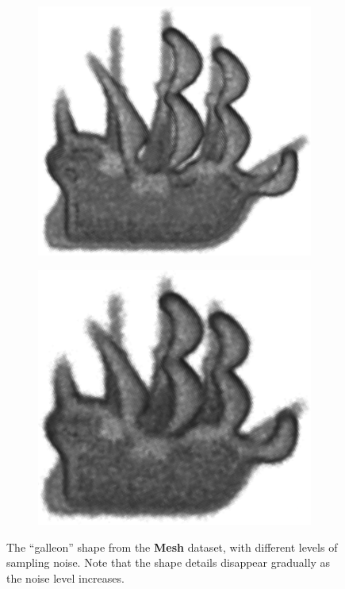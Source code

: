 \begin{figure}[ht]
\begin{subfigure}[t]{0.24\linewidth}
		\label{fig/eval/noise_low}
	\end{subfigure}
	\begin{subfigure}[t]{0.24\linewidth}\centering
		\includegraphics[width=1\linewidth]{./fig/eval/noise_mid.png}
		\label{fig/eval/noise_mid}
	\end{subfigure}
	\begin{subfigure}[t]{0.24\linewidth}\centering
		\includegraphics[width=1\linewidth]{./fig/eval/noise_high.png}
		\label{fig/eval/noise_high}
	\end{subfigure}
	\caption{The ``galleon'' shape from the \textbf{Mesh} dataset, with different levels of sampling noise. Note that the shape details disappear gradually as the noise level increases.}
	\label{fig/eval/noisesample}
\end{figure}

